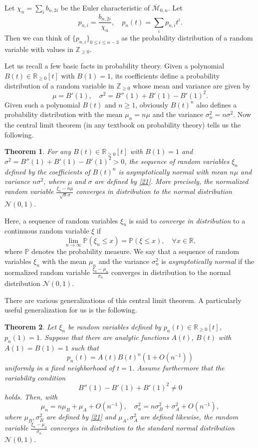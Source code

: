 \documentclass[11pt,letterpaper]{amsart}
\numberwithin{equation}{section}
\newtheorem{theorem}{Theorem}[section]
\theoremstyle{definition}
\newcommand{\PP}{\mathbb{P}}
\def\RR{\mathbb{R}}
\def\ZZ{\mathbb{Z}}
\newcommand{\cal}{\mathcal}
\def\cM{{\cal M}}
\def\cN{{\cal N}}
\def\mzn{\overline{\cM}_{0,n} }
\def\beq{\begin{equation}}
\def\eeq{\end{equation}}
\begin{document}
Let $\chi_n=\sum_i b_{n,2i}$ be the Euler characteristic of $\mzn$. Let
\beq\label{20}
p_{n,i}=\frac{b_{n,2i}}{\chi_n},\quad p_n(t)=\sum_ip_{n,i}t^i.
\eeq
Then we can think of $\{p_{n,i}\}_{0\le i\le n-3}$ as the probability distribution of a random variable with values in $\ZZ_{\ge 0}$.

Let us recall a few basic facts in probability theory.
Given a polynomial $B(t)\in \RR_{\ge 0}[t]$ with $B(1)=1$, its coefficients define a probability distribution of a random variable in $\ZZ_{\ge 0}$ whose mean and variance are given by
\beq\label{21}
\mu=B'(1),\quad \sigma^2=B''(1)+B'(1)-B'(1)^2.\eeq
Given such a polynomial $B(t)$ and $n\ge 1$, obviously $B(t)^n$ also defines a probability distribution with the mean $\mu_n=n\mu$ and the variance $\sigma_n^2=n\sigma^2$.
Now the central limit theorem (in any textbook on probability theory) tells us the following.
\begin{theorem}
    For any $B(t)\in \RR_{\ge 0}[t]$ with $B(1)=1$ and $\sigma^2=B''(1)+B'(1)-B'(1)^2>0$, the sequence of random variables $\xi_n$ defined by the coefficients of $B(t)^n$ is asymptotically normal with mean $n\mu$ and variance $n\sigma^2$, where $\mu$ and $\sigma$ are defined by \eqref{21}. More precisely, the normalized random variable $\frac{\xi_n-n\mu}{\sqrt{n}\sigma}$ converges in distribution to the normal distribution $\cN(0,1)$.%
\end{theorem}
Here, a sequence of random variables $\xi_n$ is said to \emph{converge in distribution} to a continuous random variable $\xi$ if
$$\lim_{n\to \infty} \PP(\xi_n\le x) = \PP(\xi\le x),\quad \forall x\in \RR,$$
where $\PP$ denotes the probability measure. We say that a sequence of random variables $\xi_n$ with the mean $\mu_n$ and the variance $\sigma_n^2$ is \emph{asymptotically normal} if the normalized random variable $\frac{\xi_n-\mu_n}{\sigma_n}$ converges in distribution to the normal distribution $\cN(0,1)$.

There are various generalizations of this central limit theorem. A particularly useful generalization for us is the following.
\begin{theorem} \label{22} \cite[Theorem IX.8]{FS}
Let $\xi_n$ be random variables defined by $p_n(t)\in \RR_{\ge 0}[t]$, $p_n(1)=1$. Suppose that there are analytic functions $A(t)$, $B(t)$ with $A(1)=B(1)=1$ such that
\beq\label{23} p_n(t)=A(t)B(t)^n\left(1+O(n^{-1})\right)\eeq
uniformly in a fixed neighborhood of $t=1$. Assume furthermore that the variability condition
\[ B''(1)-B'(1) +B'(1)^2 \ne 0\]
holds.
Then, with
$$\mu_n=n\mu_B+\mu_A+O(n^{-1}),\quad \sigma_n^2=n\sigma_B^2+\sigma_A^2+O(n^{-1}),$$
where $\mu_B, \sigma_B^2$ are defined by \eqref{21} and $\mu_A, \sigma_A^2$ are defined likewise, the random variable $\frac{\xi_n - \mu_n}{\sigma_n}$ converges in distribution to the standard normal distribution $\cN(0,1)$.
\end{theorem}
\end{document}
